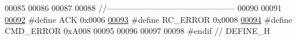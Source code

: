 \begin{DoxyCode}
00085 
00086 
00087 
00088 \textcolor{comment}{//-----------------------------------------------}
00090 \textcolor{comment}{}
00091 
\hypertarget{a00034_source_l00092}{}\hyperlink{a00034_a6f6489887e08bff4887d0bc5dcf214d8}{00092} \textcolor{preprocessor}{#define    ACK                                                  0x0006}
\hypertarget{a00034_source_l00093}{}\hyperlink{a00034_a993a04d3d34ab3326d1786c66e3aaa1a}{00093} \textcolor{preprocessor}{#define    RC\_ERROR                                             0x0008}
\hypertarget{a00034_source_l00094}{}\hyperlink{a00034_a1764a522e9c1a59a59be8757c69fa494}{00094} \textcolor{preprocessor}{#define    CMD\_ERROR                                            0xA008}
00095 
00096 
00097 
00098 \textcolor{preprocessor}{#endif // DEFINE\_H}
\end{DoxyCode}
